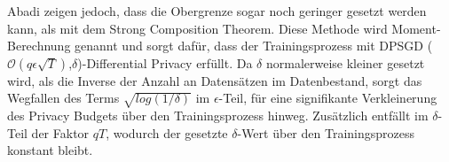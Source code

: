Abadi \etal \cite{P-28} zeigen jedoch, dass die Obergrenze sogar noch geringer gesetzt werden kann, als mit dem Strong Composition Theorem.
Diese Methode wird Moment-Berechnung genannt und sorgt dafür, dass der Trainingsprozess mit DPSGD ($\mathcal{O}(q\epsilon \sqrt{T})$,$\delta$)-Differential Privacy erfüllt.
Da $\delta$ normalerweise kleiner gesetzt wird, als die Inverse der Anzahl an Datensätzen im Datenbestand, sorgt das Wegfallen des Terms $\sqrt{log (1/\delta)}$ im $\epsilon$-Teil, für eine signifikante Verkleinerung des Privacy Budgets über den Trainingsprozess hinweg.
Zusätzlich entfällt im $\delta$-Teil der Faktor $qT$, wodurch der gesetzte $\delta$-Wert über den Trainingsprozess konstant bleibt.